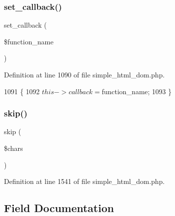 \subsubsection{\texorpdfstring{set\+\_\+callback()}{set\_callback()}}
{\footnotesize\ttfamily set\+\_\+callback (\begin{DoxyParamCaption}\item[{}]{\$function\+\_\+name }\end{DoxyParamCaption})}



Definition at line 1090 of file simple\+\_\+html\+\_\+dom.\+php.


\begin{DoxyCode}
1091     \{
1092         $this->callback = $function\_name;
1093     \}
\end{DoxyCode}
\hypertarget{classsimple__html__dom_a83de9b35df2e0857f2b0be5bff3e4960}{}\label{classsimple__html__dom_a83de9b35df2e0857f2b0be5bff3e4960} 
\subsubsection{\texorpdfstring{skip()}{skip()}}
{\footnotesize\ttfamily skip (\begin{DoxyParamCaption}\item[{}]{\$chars }\end{DoxyParamCaption})\hspace{0.3cm}{\ttfamily [protected]}}



Definition at line 1541 of file simple\+\_\+html\+\_\+dom.\+php.




\subsection{Field Documentation}
\hypertarget{classsimple__html__dom_ad6b00a32790b456a2f1668b2010a262e}{}\label{classsimple__html__dom_ad6b00a32790b456a2f1668b2010a262e} 
